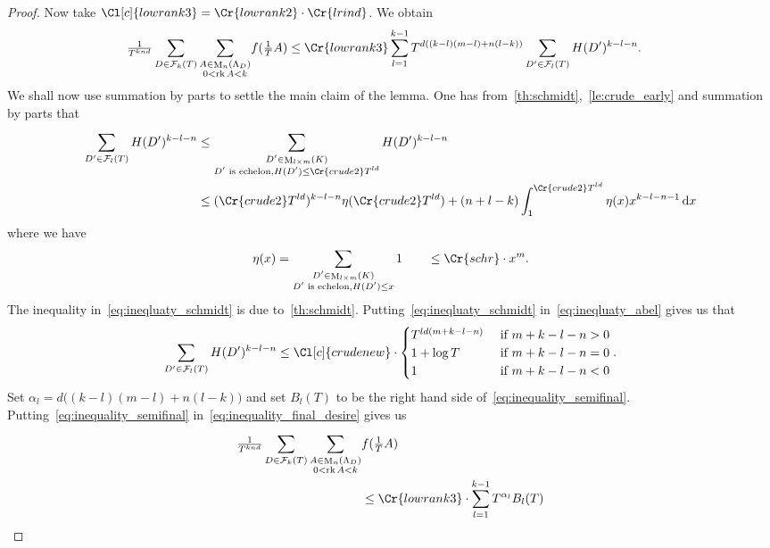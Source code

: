 \documentclass{amsart}
\theoremstyle{definition}
\theoremstyle{remark}
\newcommand{\diff}{\,\mathrm{d}}
\DeclareMathOperator{\M}{M}
\DeclareMathOperator{\rank}{rk}
\begin{document}
\begin{proof}
    Now take $\Cl[c]{lowrank3} = \Cr{lowrank2} \cdot \Cr{lrind}$. We obtain
    \begin{align}
        \tfrac{1}{T^{knd}} \sum_{D \in \mathcal{F}_{k}{(T)}} \sum_{\substack{A \in \M_{n}(\Lambda_{D}) \\ 0  < \rank A < k }}^{}  
      & f(\tfrac{1}{T} A ) 
      \leq  \Cr{lowrank3} \sum_{l=1}^{k-1} T^{d((k-l)(m-l) + n(l - k))} 
      \sum_{D' \in \mathcal{F}_{l}(T)}^{}
      H(D')^{k-l-n}.
      \label{eq:inequality_final_desire}
    \end{align}
    We shall now use summation by parts to settle the main claim of the lemma. 
    One has from~\cref{th:schmidt},~\cref{le:crude_early} and summation by parts that
    \begin{align}
        \sum_{D' \in \mathcal{F}_{l}(T)}^{}
        H(D')^{k-l-n} 
      & \leq 
      \sum_{\substack{D' \in \M_{l \times m}(K) \\ D' \text{  is echelon}, H(D') \leq \Cr{crude2}T^{ld} }} H(D')^{k-l-n} 
      \\
      & \leq 
      {(\Cr{crude2}T^{ld})^{k-l-n}}
      \eta( \Cr{crude2}T^{ld})
      + (n+l-k)\int_{1}^{\Cr{crude2}T^{ld}} \eta(x) x^{k-l-n-1} \diff x   \\
      \label{eq:ineqluaty_abel}
    \end{align}
    where we have
    \begin{equation}
        \eta(x) = 
        \sum_{\substack{D' \in \M_{l \times m}(K) \\ D' \text{  is echelon}, H(D') \leq x }} 1 \ \ \ \ \ \   \leq \Cr{schr} \cdot x^{{m}}.
        \label{eq:ineqluaty_schmidt}
    \end{equation}
    The inequality in~\cref{eq:ineqluaty_schmidt} is due to~\cref{th:schmidt}.
    Putting~\cref{eq:ineqluaty_schmidt} in~\cref{eq:ineqluaty_abel} gives us that
    \begin{equation}
        \sum_{D' \in \mathcal{F}_{l}(T)}^{}
        H(D')^{k-l-n} 
        \leq \Cl[c]{crudenew}\cdot 
        \begin{cases}
          T^{ld(m+k-l-n)} & \text{ if } m+k-l-n > 0 \\
           1 + \log T&  \text{ if } m+k-l-n=0 \\ 
           1 &\text{ if }m+k-l-n < 0 
        \end{cases}
        \label{eq:inequality_semifinal}.
    \end{equation}
    Set $\alpha_{l} = d \Big( (k-l)(m-l)  + n(l-k)\Big)$ and set $B_{l}(T)$ to be the right hand side of~\cref{eq:inequality_semifinal}.
    Putting~\cref{eq:inequality_semifinal} in~\cref{eq:inequality_final_desire} gives us
    \begin{align}
        \tfrac{1}{T^{knd}} \sum_{D \in \mathcal{F}_{k}{(T)}} \sum_{\substack{A \in \M_{n}(\Lambda_{D}) \\ 0 < \rank A < k }}^{}  
      & f(\tfrac{1}{T} A )  \\
      & \leq  \Cr{lowrank3} \cdot \sum_{l=1}^{k-1} 
      T^{ \alpha_{l}} B_{l}(T)
    \end{align}


\end{proof}
\end{document}
